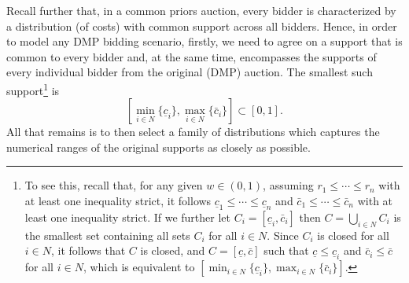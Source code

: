 Recall further that, in a common priors auction, every bidder is characterized by a distribution (of costs) with common support across all bidders. Hence, in order to model any DMP bidding scenario, firstly, we need to agree on a support that is common to every bidder and, at the same time, encompasses the supports of every individual bidder from the original (DMP) auction. The smallest such support\footnote{To see this, recall that, for any given $w\in (0,1)$, assuming $r_1\leq\cdots\leq r_n$ with at least one inequality strict, it follows $\underline{c}_1\leq\cdots\leq\underline{c}_n$ and $\bar{c}_1\leq\cdots\leq\bar{c}_n$ with at least one inequality strict. If we further let $C_i = [\underline{c}_i, \bar{c}_i]$ then $C = \bigcup_{i\in N} C_i$ is the smallest set containing all sets $C_i$ for all $i\in N$. Since $C_i$ is closed for all $i\in N$, it follows that $C$ is closed, and $C = [\underline{c}, \bar{c}]$ such that $\underline{c} \leq \underline{c}_i$ and $\bar{c}_i\leq \bar{c}$ for all $i\in N$, which is equivalent to $[\min_{i\in N}\{\underline{c}_i\}, \max_{i\in N}\{\bar{c}_i\}]$.} is
\begin{equation*}
  \displaystyle\left[\min_{i\in N}\{\underline{c}_i\}, \max_{i\in N}\{\bar{c}_i\}\right] \subset [0,1].
\end{equation*}
All that remains is to then select a family of distributions which captures the numerical ranges of the original supports as closely as possible.

